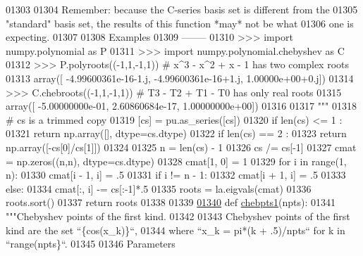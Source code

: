 \begin{DoxyCode}
01303 \textcolor{stringliteral}{}
01304 \textcolor{stringliteral}{    Remember: because the C-series basis set is different from the}
01305 \textcolor{stringliteral}{    "standard" basis set, the results of this function *may* not be what}
01306 \textcolor{stringliteral}{    one is expecting.}
01307 \textcolor{stringliteral}{}
01308 \textcolor{stringliteral}{    Examples}
01309 \textcolor{stringliteral}{    --------}
01310 \textcolor{stringliteral}{    >>> import numpy.polynomial as P}
01311 \textcolor{stringliteral}{    >>> import numpy.polynomial.chebyshev as C}
01312 \textcolor{stringliteral}{    >>> P.polyroots((-1,1,-1,1)) # x^3 - x^2 + x - 1 has two complex roots}
01313 \textcolor{stringliteral}{    array([ -4.99600361e-16-1.j,  -4.99600361e-16+1.j,   1.00000e+00+0.j])}
01314 \textcolor{stringliteral}{    >>> C.chebroots((-1,1,-1,1)) # T3 - T2 + T1 - T0 has only real roots}
01315 \textcolor{stringliteral}{    array([ -5.00000000e-01,   2.60860684e-17,   1.00000000e+00])}
01316 \textcolor{stringliteral}{}
01317 \textcolor{stringliteral}{    """}
01318     \textcolor{comment}{# cs is a trimmed copy}
01319     [cs] = pu.as\_series([cs])
01320     \textcolor{keywordflow}{if} len(cs) <= 1 :
01321         \textcolor{keywordflow}{return} np.array([], dtype=cs.dtype)
01322     \textcolor{keywordflow}{if} len(cs) == 2 :
01323         \textcolor{keywordflow}{return} np.array([-cs[0]/cs[1]])
01324 
01325     n = len(cs) - 1
01326     cs /= cs[-1]
01327     cmat = np.zeros((n,n), dtype=cs.dtype)
01328     cmat[1, 0] = 1
01329     \textcolor{keywordflow}{for} i \textcolor{keywordflow}{in} range(1, n):
01330         cmat[i - 1, i] = .5
01331         \textcolor{keywordflow}{if} i != n - 1:
01332             cmat[i + 1, i] = .5
01333         \textcolor{keywordflow}{else}:
01334             cmat[:, i] -= cs[:-1]*.5
01335     roots = la.eigvals(cmat)
01336     roots.sort()
01337     \textcolor{keywordflow}{return} roots
01338 
01339 
\hypertarget{chebyshev_8py_source_l01340}{}\hyperlink{namespacepyneb_1_1utils_1_1chebyshev_a5ac57e95809a1f627400a7c3a34606f7}{01340} \textcolor{keyword}{def }\hyperlink{namespacepyneb_1_1utils_1_1chebyshev_a5ac57e95809a1f627400a7c3a34606f7}{chebpts1}(npts):
01341     \textcolor{stringliteral}{"""Chebyshev points of the first kind.}
01342 \textcolor{stringliteral}{}
01343 \textcolor{stringliteral}{    Chebyshev points of the first kind are the set ``\{cos(x\_k)\}``,}
01344 \textcolor{stringliteral}{    where ``x\_k = pi*(k + .5)/npts`` for k in ``range(npts\}``.}
01345 \textcolor{stringliteral}{}
01346 \textcolor{stringliteral}{    Parameters}

\end{DoxyCode}

